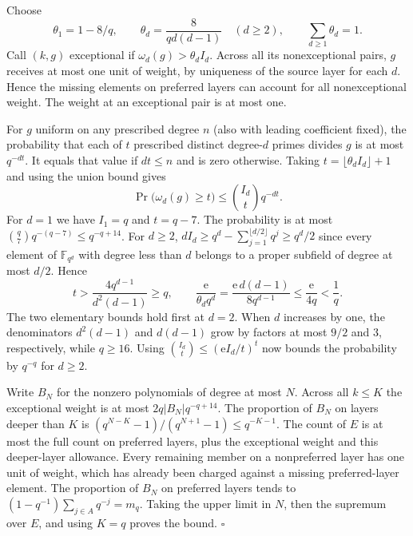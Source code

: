 Choose
\[
 \theta_1=1-8/q,\qquad \theta_d=\frac{8}{q d(d-1)}
 \quad(d\ge2),\qquad \sum_{d\ge1}\theta_d=1.
\]
Call $(k,g)$ exceptional if $\omega_d(g)>\theta_d I_d$.
Across all its nonexceptional pairs, $g$ receives at most one unit
of weight, by uniqueness of the source layer for each $d$.
Hence the missing elements on preferred layers can account for all
nonexceptional weight. The weight at an exceptional pair is at most one.

For $g$ uniform on any prescribed degree $n$ (also with leading
coefficient fixed), the probability that each of $t$ prescribed distinct
degree-$d$ primes divides $g$ is at most $q^{-dt}$. It equals that value
if $dt\le n$ and is zero otherwise. Taking
$t=\lfloor\theta_d I_d\rfloor+1$ and using the union bound gives
\[
 \Pr\big(\omega_d(g)\ge t\big)\le {I_d\choose t}q^{-dt}.
\]
For $d=1$ we have $I_1=q$ and $t=q-7$. The probability is at most
$\binom q7q^{-(q-7)}\le q^{-q+14}$. For $d\ge2$,
$dI_d\ge q^d-\sum_{j=1}^{\lfloor d/2\rfloor}q^j\ge q^d/2$ since
every element of $\mathbb F_{q^d}$ with degree less than $d$ belongs
to a proper subfield of degree at most $d/2$.
Hence
\[
  t>\frac{4q^{d-1}}{d^2(d-1)}\ge q,\qquad
  \frac{\mathrm e}{\theta_d q^d}
    =\frac{\mathrm e\,d(d-1)}{8q^{d-1}}\le\frac{\mathrm e}{4q}<\frac1q .
\]
The two elementary bounds hold first at $d=2$. When $d$ increases by
one, the denominators $d^2(d-1)$ and $d(d-1)$ grow by factors at
most $9/2$ and $3$, respectively, while $q\ge16$.
Using $\binom{I_d}{t}\le(\mathrm e I_d/t)^t$ now bounds the probability
by $q^{-q}$ for $d\ge2$.

Write $B_N$ for the nonzero polynomials of degree at most $N$.
Across all $k\le K$ the exceptional weight is at most
$2q|B_N|q^{-q+14}$. The proportion of $B_N$ on layers deeper than
$K$ is $(q^{N-K}-1)/(q^{N+1}-1)\le q^{-K-1}$.
The count of $E$ is at most the full count on preferred layers,
plus the exceptional weight and this deeper-layer allowance. Every
remaining member on a nonpreferred layer has one unit of weight, which
has already been charged against a missing preferred-layer element.
The proportion of $B_N$ on preferred layers tends to
$(1-q^{-1})\sum_{j\in A}q^{-j}=m_q$. Taking the upper limit in $N$,
then the supremum over $E$, and using $K=q$ proves the bound.
\hfill$\square$
